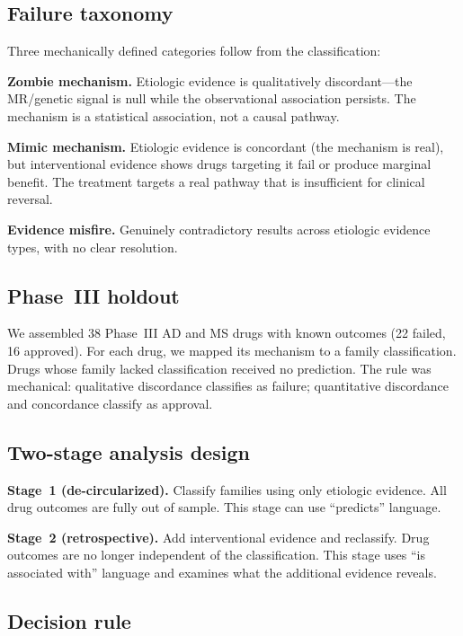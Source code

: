 \documentclass[11pt]{article}
\begin{document}
\subsection{Failure taxonomy}

Three mechanically defined categories follow from the classification:

\textbf{Zombie mechanism.} Etiologic evidence is qualitatively discordant---the MR/genetic signal is null while the observational association persists. The mechanism is a statistical association, not a causal pathway.

\textbf{Mimic mechanism.} Etiologic evidence is concordant (the mechanism is real), but interventional evidence shows drugs targeting it fail or produce marginal benefit. The treatment targets a real pathway that is insufficient for clinical reversal.

\textbf{Evidence misfire.} Genuinely contradictory results across etiologic evidence types, with no clear resolution.

\subsection{Phase~III holdout}

We assembled 38 Phase~III AD and MS drugs with known outcomes (22 failed, 16 approved). For each drug, we mapped its mechanism to a family classification. Drugs whose family lacked classification received no prediction. The rule was mechanical: qualitative discordance classifies as failure; quantitative discordance and concordance classify as approval.

\subsection{Two-stage analysis design}

\textbf{Stage~1 (de-circularized).} Classify families using only etiologic evidence. All drug outcomes are fully out of sample. This stage can use ``predicts'' language.

\textbf{Stage~2 (retrospective).} Add interventional evidence and reclassify. Drug outcomes are no longer independent of the classification. This stage uses ``is associated with'' language and examines what the additional evidence reveals.

\subsection{Decision rule}
\end{document}
